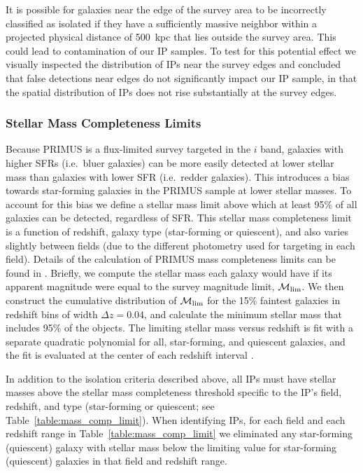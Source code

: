 It is possible for galaxies near the edge of the survey area to be incorrectly classified as isolated if they have a sufficiently massive neighbor within a projected physical distance of 500~kpc that lies outside the survey area.
This could lead to contamination of our IP samples.
To test for this potential effect we visually inspected the distribution of IPs near the survey edges and concluded that false detections near edges do not significantly impact our IP sample, in that the spatial distribution of IPs does not rise substantially at the survey edges. 

\subsubsection{Stellar Mass Completeness Limits}\label{sec:mass_limit}

Because PRIMUS is a flux-limited survey targeted in the $i$ band, galaxies with higher SFRs (i.e.~bluer galaxies) can be more easily detected at lower stellar mass than galaxies with lower SFR (i.e.~redder galaxies).
This introduces a bias towards star-forming galaxies in the PRIMUS sample at lower stellar masses.
To account for this bias we define a stellar mass limit above which at least 95\% of all galaxies can be detected, regardless of SFR.
This stellar mass completeness limit is a function of redshift, galaxy type (star-forming or quiescent), and also varies slightly between fields (due to the different photometry used for targeting in each field).
Details of the calculation of PRIMUS mass completeness limits can be found in \citet{Moustakas13}.
Briefly, we compute the stellar mass each galaxy would have if its apparent magnitude were equal to the survey magnitude limit, $\mlim$.  We then construct the cumulative distribution of $\mlim$ for the 15\% faintest galaxies in redshift bins of width ${\Delta z=0.04}$, and calculate the minimum stellar mass that includes 95\% of the objects.  The limiting stellar mass versus redshift is fit with a separate quadratic polynomial for all, star-forming, and quiescent galaxies, and the fit is evaluated at the center of each redshift interval \citep[see][]{Moustakas13}.

In addition to the isolation criteria described above, all IPs must have stellar masses above the stellar mass completeness threshold specific to the IP's field, redshift, and type (star-forming or quiescent; see Table~\ref{table:mass_comp_limit}).  When identifying IPs, for each field and each redshift range in Table~\ref{table:mass_comp_limit} we eliminated any star-forming (quiescent) galaxy with stellar mass below the limiting value for star-forming (quiescent) galaxies in that field and redshift range.

